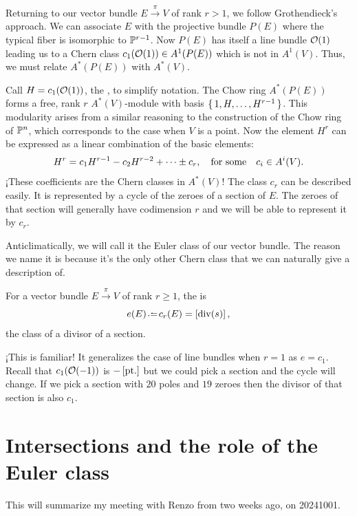 \documentclass[12pt]{memoir}
\begin{document}
Returning to our vector bundle $E\xrightarrow{\pi}V$ of rank $r>1$, we follow Grothendieck's approach. We can associate $E$ with the projective bundle $P(E)$ where the typical fiber is isomorphic to $\mathbb{P}^{r-1}$. Now $P(E)$ has itself a line bundle $\mathcal{O}(1)$ leading us to a Chern class $c_1(\mathcal{O}(1))\in A^1(P(E))$ which is not in $A^1(V)$. Thus, we must relate $A^\ast(P(E))$ with $A^\ast(V)$.\par
Call $H=c_1(\mathcal{O}(1))$, the , to simplify notation. The Chow ring $A^\ast(P(E))$ forms a free, rank $r$ $A^\ast(V)$-module with basis $\{\,1,H,\dots,H^{r-1}\,\}$. This modularity arises from a similar reasoning to the construction of the Chow ring of $\mathbb{P}^n$, which corresponds to the case when $V$ is a point. Now the element $H^r$ can be expressed as a linear combination of the basic elements: 
$$H^r=c_1H^{r-1}-c_2H^{r-2}+\dots\pm c_r,\quad\text{for some}\quad c_i\in A^i(V).$$
¡These coefficients are the Chern classes in $A^\ast(V)$! The class $c_r$ can be described easily. It is represented by a cycle of the zeroes of a section of $E$. The zeroes of that section will generally have codimension $r$ and we will be able to represent it by $c_r$.\par

Anticlimatically, we will call it the Euler class of our vector bundle. The reason we name it is because it's the only other Chern class that we can naturally give a description of.

\begin{Def}
    For a vector bundle $E\xrightarrow{\pi}V$ of rank $r\geq 1$, the  is 
    $$e(E)\defeq c_r(E)=\bonj{\div(s)},$$
    the class of a divisor of a section.
\end{Def}

\begin{Rmk}
    ¡This is familiar! It generalizes the case of line bundles when $r=1$ as $e=c_1$. Recall that $c_1(\mathcal{O}(-1))$ is $-\left\lbrack\text{pt}.\right\rbrack$ but we could pick a section and the cycle will change. If we pick a section with $20$ poles and $19$ zeroes then the divisor of that section is also $c_1$.
\end{Rmk}

\section{Intersections and the role of the Euler class}

This will summarize my meeting with Renzo from two weeks ago, on 20241001.
\end{document}
